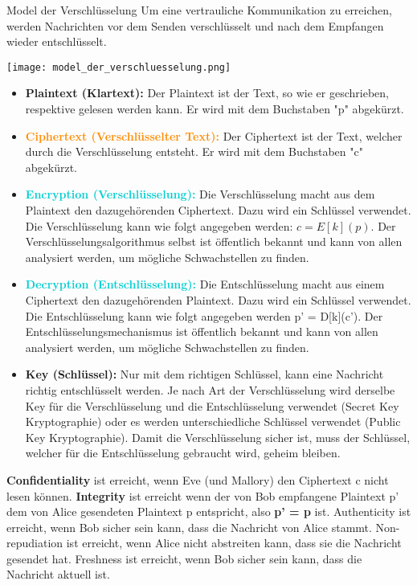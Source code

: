 \begin{concept}{Model der Verschlüsselung}
    Um eine vertrauliche Kommunikation zu erreichen, werden Nachrichten vor dem Senden verschlüsselt und nach dem Empfangen wieder entschlüsselt.

    \texttt{[image: model\_der\_verschluesselung.png]}

    \begin{itemize}
        \item \textcolor{darkcorn}{\textbf{Plaintext (Klartext):}} Der Plaintext ist der Text, so wie er geschrieben, respektive gelesen werden kann. Er wird mit dem Buchstaben "p" abgekürzt.
        \item \textcolor{darkorange}{\textbf{Ciphertext (Verschlüsselter Text):}} Der Ciphertext ist der Text, welcher durch die Verschlüsselung entsteht. Er wird mit dem Buchstaben "c" abgekürzt.
        \item \textcolor{darkturquoise}{\textbf{Encryption (Verschlüsselung):}} Die Verschlüsselung macht aus dem Plaintext den dazugehörenden Ciphertext. Dazu wird ein Schlüssel verwendet. Die Verschlüsselung kann wie folgt angegeben werden: $c=E[k](p)$. Der Verschlüsselungsalgorithmus selbst ist öffentlich bekannt und kann von allen analysiert werden, um mögliche Schwachstellen zu finden.
        \item \textcolor{darkturquoise}{\textbf{Decryption (Entschlüsselung):}} Die Entschlüsselung macht aus einem Ciphertext den dazugehörenden Plaintext. Dazu wird ein Schlüssel verwendet. Die Entschlüsselung kann wie folgt angegeben werden p' = D[k](c'). Der Entschlüsselungsmechanismus ist öffentlich bekannt und kann von allen analysiert werden, um mögliche Schwachstellen zu finden.
        \item \textcolor{darkpink}{\textbf{Key (Schlüssel):}} Nur mit dem richtigen Schlüssel, kann eine Nachricht richtig entschlüsselt werden. Je nach Art der Verschlüsselung wird derselbe Key für die Verschlüsselung und die Entschlüsselung verwendet (Secret Key Kryptographie) oder es werden unterschiedliche Schlüssel verwendet (Public Key Kryptographie). Damit die Verschlüsselung sicher ist, muss der Schlüssel, welcher für die Entschlüsselung gebraucht wird, geheim bleiben.
    \end{itemize}

    \textbf{Confidentiality} ist erreicht, wenn Eve (und Mallory) den Ciphertext c nicht lesen können. \textbf{Integrity} ist erreicht wenn der von Bob empfangene Plaintext p' dem von Alice gesendeten Plaintext p entspricht, also \textcolor{darkcorn}{\textbf{p' = p}} ist. Authenticity ist erreicht, wenn Bob sicher sein kann, dass die Nachricht von Alice stammt. Non-repudiation ist erreicht, wenn Alice nicht abstreiten kann, dass sie die Nachricht gesendet hat. Freshness ist erreicht, wenn Bob sicher sein kann, dass die Nachricht aktuell ist.
    
\end{concept}

